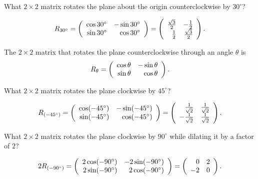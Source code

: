 \documentclass{ximera}
\begin{document}
\begin{exercise} \label{c4.2.1a}
What $2\times 2$ matrix rotates the plane about the origin counterclockwise
by $30^\circ$?

\begin{solution}
\ans
\[ R_{30^\circ} = \left(\begin{array}{rr} \cos 30^\circ & -\sin 30^\circ\\ \sin 30^\circ &\cos 30^\circ\end{array}\right) =
\left(\begin{array}{rr} \frac{\sqrt{3}}{2} & -\frac{1}{2}\\ \frac{1}{2} &\frac{\sqrt{3}}{2}\end{array}\right).
\]

\soln The $2\times 2$ matrix that rotates the plane counterclockwise
through an angle $\theta$ is
\[
R_{\theta} = \left(\begin{array}{rr} \cos \theta & -\sin \theta\\ \sin \theta &\cos \theta\end{array}\right).
\]


\end{solution}
\end{exercise}
\begin{exercise} \label{c4.2.1b}
What $2\times 2$ matrix rotates the plane clockwise by $45^\circ$?

\begin{solution}
\ans
\[
R_{(-45^\circ)} = \left(\begin{array}{rr} \cos (-45^\circ) & -\sin
(-45^\circ)\\ \sin (-45^\circ) &\cos (-45^\circ)\end{array}\right) =
\left(\begin{array}{rr} \frac{1}{\sqrt{2}} & \frac{1}{\sqrt{2}}\\ -\frac{1}{\sqrt{2}} &\frac{1}{\sqrt{2}}\end{array}\right).
\]

\end{solution}
\end{exercise}
\begin{exercise} \label{c4.2.1c}
What $2\times 2$ matrix rotates the plane clockwise by $90^\circ$ while
dilating it by a factor of $2$?

\begin{solution}
\ans
\[
2R_{(-90^\circ)} = \left(\begin{array}{rr} 2\cos (-90^\circ) & -2\sin
(-90^\circ)\\ 2\sin (-90^\circ) &2\cos (-90^\circ)\end{array}\right) = \left(\begin{array}{rr} 0 & 2\\ -2 &0\end{array}\right).
\]

\end{solution}
\end{exercise}
\end{document}
